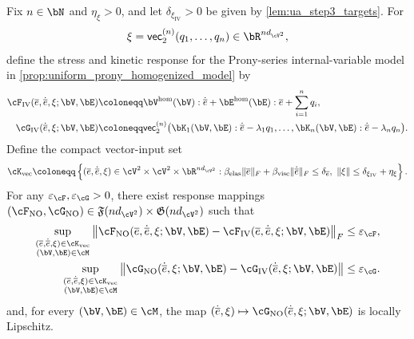 \begin{proposition}\label{prop:ua_step3_no}
Fix $n\in\bN$ and $\eta_{\xi}>0$, and let $\delta_{\xi_{\mathrm{IV}}}>0$ be given by \cref{lem:ua_step3_targets}. For
\begin{equation*}
\xi=\mathsf{vec}_2^{(n)}(q_1,\dots,q_n)\in\bR^{nd_{\cV^2}},
\end{equation*}
define the stress and kinetic response for the Prony-series internal-variable model in \cref{prop:uniform_prony_homogenized_model} by
\begin{align*}
\cF_{\mathrm{IV}}(\overline{e},\dot{\overline{e}},\xi;\bV,\bE)
&\coloneqq
\bV^{\rm hom}(\bV):\dot{\overline{e}}
+\bE^{\rm hom}(\bE):\overline{e}
+\sum_{i=1}^{n} q_i,\\
\cG_{\mathrm{IV}}(\dot{\overline{e}},\xi;\bV,\bE)
&\coloneqq
\mathsf{vec}_2^{(n)}\big(\bK_1(\bV,\bE):\dot{\overline{e}}-\lambda_1 q_1,\dots,
\bK_n(\bV,\bE):\dot{\overline{e}}-\lambda_n q_n\big).
\end{align*}
Define the compact vector-input set
\begin{equation*}
    \cK_{\mathrm{vec}}\coloneqq
\left\{(\overline{e},\dot{\overline{e}},\xi)\in
\cV^{2}\times\cV^{2}\times\bR^{nd_{\cV^2}}:
\beta_{\rm elas}\|\overline{e}\|_F+\beta_{\rm visc}\|\dot{\overline{e}}\|_F\le \delta_{\overline{e}},\ \|\xi\|\le \delta_{\xi_{\rm IV}} + \eta_{\xi}
\right\}.
\end{equation*}
For any $\varepsilon_{\cF},\varepsilon_{\cG}>0$, there exist response mappings $    (\cF_{\mathrm{NO}},\cG_{\mathrm{NO}})\in \mathfrak{F}(nd_{\cV^2})\times \mathfrak{G}(nd_{\cV^2})$ such that
    \begin{align}
    \sup_{\substack{(\overline e,\dot{\overline e},\xi)\in \cK_{\mathrm{vec}}\\(\bV,\bE)\in \cM}}
    \left\|\cF_{\mathrm{NO}}(\overline e,\dot{\overline e},\xi;\bV,\bE)-\cF_{\mathrm{IV}}(\overline e,\dot{\overline e},\xi;\bV,\bE)\right\|_F
    &\leq \varepsilon_{\cF},\label{eq:ua_full_F_approx}\\
    \sup_{\substack{(\overline e,\dot{\overline e},\xi)\in \cK_{\mathrm{vec}}\\(\bV,\bE)\in \cM}}
    \left\|\cG_{\mathrm{NO}}(\dot{\overline e},\xi;\bV,\bE)-\cG_{\mathrm{IV}}(\dot{\overline e},\xi;\bV,\bE)\right\|
    &\leq \varepsilon_{\cG}.\label{eq:ua_full_G_approx}
    \end{align}
    and, for every $(\bV,\bE)\in\cM$, the map $(\dot{\overline e},\xi)\mapsto \cG_{\mathrm{NO}}(\dot{\overline e},\xi;\bV,\bE)$ is locally Lipschitz.
\end{proposition}

